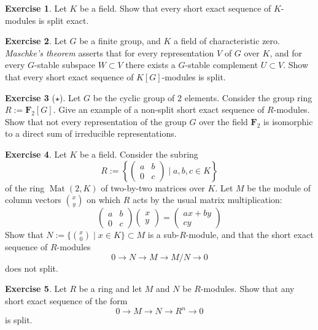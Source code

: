 \documentclass[11pt]{amsbook}
\newcommand{\longto}{\longrightarrow}
\DeclareMathOperator\Mat{Mat}
\def\bF{{\mathbf{F}}} \def\bG{\mathbf{G}} \def\bR{{\mathbf{R}}}
\theoremstyle{plain}
\theoremstyle{definition}
\newtheorem{exercise}{Exercise}
\begin{document}
\begin{exercise}Let $K$ be a field. Show that every short exact sequence of $K$-modules is split exact.
\end{exercise}

\begin{exercise}
Let $G$ be a finite group, and $K$ a field of characteristic zero. \emph{Maschke's theorem} asserts that for every representation $V$ of $G$ over $K$, and for every $G$-stable subspace $W\subset V$ there exists a $G$-stable complement $U\subset V$. 
Show that every short exact sequence of $K[G]$-modules is split. 
\end{exercise}

\begin{exercise}[$\star$]
Let $G$ be the cyclic group of $2$ elements. Consider the group ring $R:=\bF_2[G]$. Give an example of a non-split short exact sequence of $R$-modules. Show that not every representation of the group $G$ over the field $\bF_2$ is isomorphic to a direct sum of irreducible representations. 
\end{exercise}


\begin{exercise}Let $K$ be a field. Consider the subring
\[
	R := \left\{ \left(\begin{matrix} a & b \\ 0 & c \end{matrix}\right) \mid a,b,c\in K \right \}
\]
of the ring $\Mat(2,K)$ of two-by-two matrices over $K$.
Let $M$ be the module of column vectors $x \choose {y}$ on which $R$ acts by the usual matrix multiplication:
\[
\left(\begin{matrix} a & b \\ 0 & c \end{matrix}\right)
\left(\begin{matrix} x  \\ y \end{matrix}\right) =
\left(\begin{matrix} ax + by  \\ cy \end{matrix}\right)
\]
Show that $N:= \{ {x \choose 0} \mid x \in K \} \subset M$ is a sub-$R$-module, and that the short exact sequence
of $R$-modules
\[
	0 \longto N \longto M \longto M/N \longto 0
\]
does not split.
\end{exercise}

\begin{exercise}\label{exc:free-module-split-short-exact-sequence}
Let $R$ be a ring and let $M$ and $N$ be $R$-modules. Show that any short exact sequence of the form
\[
	0 \longto M \longto N \longto R^n \longto 0
\]
is split. 
\end{exercise}
\end{document}

